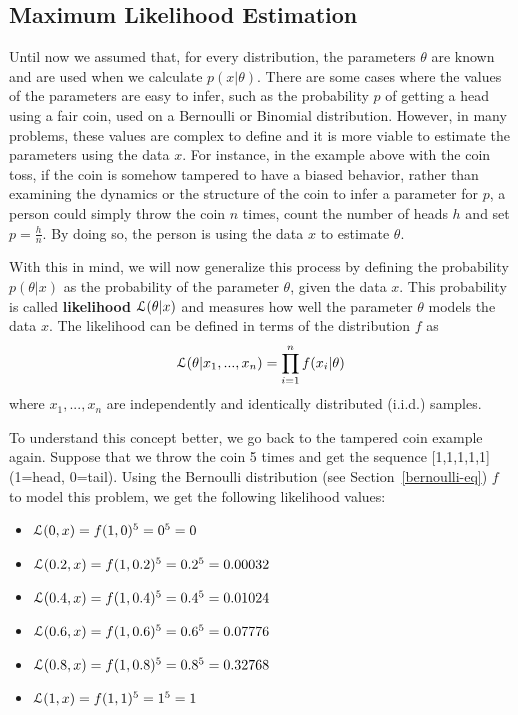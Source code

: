 \subsection{Maximum Likelihood Estimation}
Until now we assumed that, for every distribution, the parameters $\theta$ are known and are used when we calculate $p(x|\theta)$. There are some cases where the values of the parameters are easy to infer, such as the probability $p$ of getting a head using a fair coin, used on a Bernoulli or Binomial distribution. However, in many problems, these values are complex to define and it is more viable to estimate the parameters using the data $x$. For instance, in the example above with the coin toss, if the coin is somehow tampered to have a biased behavior, rather than examining the dynamics or the structure of the coin to infer a parameter for $p$, a person could simply throw the coin $n$ times, count the number of heads $h$ and set $p=\frac{h}{n}$. By doing so, the person is using the data $x$ to estimate $\theta$.

With this in mind, we will now generalize this process by defining the probability $p(\theta|x)$ as the probability of the parameter $\theta$, given the data $x$. This probability is called {\bf likelihood} $\mathcal{L}(\theta|x)$ and measures how well the parameter $\theta$ models the data $x$. The likelihood can be defined in terms of the distribution $f$ as
\begin{equation*}
\mathcal{L}(\theta|x_1,...,x_n)=\prod_{i=1}^n f(x_i|\theta)
\end{equation*}
where $x_1,...,x_n$ are independently and identically distributed (i.i.d.) samples.

To understand this concept better, we go back to the tampered coin example again. Suppose that we throw the coin 5 times and get the sequence [1,1,1,1,1] (1=head, 0=tail). Using the Bernoulli distribution (see Section~\ref{bernoulli-eq}) $f$ to model this problem, we get the following likelihood values:
\begin{itemize}
\item $\mathcal{L}(0,x) = f(1,0)^5 = 0^5 = 0$
\item $\mathcal{L}(0.2,x) = f(1,0.2)^5 = 0.2^5 = 0.00032$
\item $\mathcal{L}(0.4,x) = f(1,0.4)^5 = 0.4^5 = 0.01024$
\item $\mathcal{L}(0.6,x) = f(1,0.6)^5 = 0.6^5 = 0.07776$
\item $\mathcal{L}(0.8,x) = f(1,0.8)^5 = 0.8^5 = 0.32768$
\item $\mathcal{L}(1,x) = f(1,1)^5 = 1^5 = 1$
\end{itemize}

